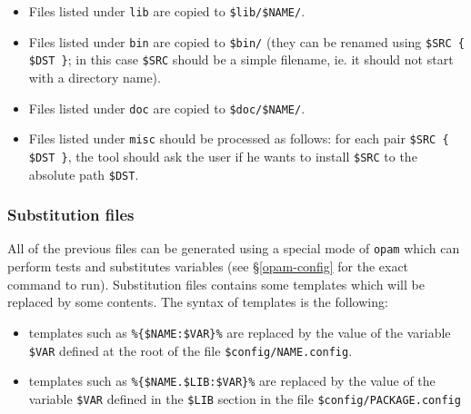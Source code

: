 \documentclass[a4paper,11pt]{article}
\begin{document}
\begin{itemize}
\item Files listed under {\tt lib} are copied to \verb+$lib/$NAME/+.
\item Files listed under {\tt bin} are copied to \verb+$bin/+ (they
  can be renamed using \verb+$SRC { $DST }+; in this case \verb+$SRC+
  should be a simple filename, ie. it should not start with a
  directory name).
\item Files listed under {\tt doc} are copied to \verb+$doc/$NAME/+.
\item Files listed under {\tt misc} should be processed as follows:
  for each pair \verb+$SRC { $DST }+, the tool should ask the user if
  he wants to install \verb+$SRC+ to the absolute path \verb+$DST+.
\end{itemize}

\subsubsection{Substitution files}
\label{subst}

All of the previous files can be generated using a special mode of
{\tt opam} which can perform tests and substitutes variables (see
\S\ref{opam-config} for the exact command to run). Substitution files
contains some templates which will be replaced by some contents. The
syntax of templates is the following:

\begin{itemize}

\item templates such as \verb+%{$NAME:$VAR}%+ are replaced by the value
  of the variable \verb+$VAR+ defined at the root of the file
  \verb+$config/NAME.config+.

\item templates such as \verb+%{$NAME.$LIB:$VAR}%+ are replaced by the
  value of the variable \verb+$VAR+ defined in the \verb+$LIB+ section
  in the file \verb+$config/PACKAGE.config+


\end{itemize}
\end{document}
